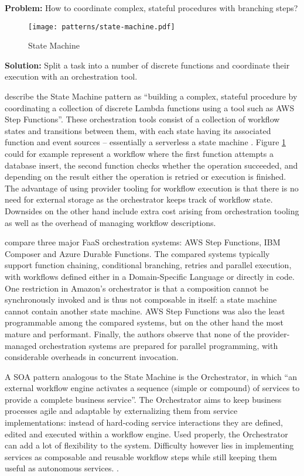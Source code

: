 \textbf{Problem:} How to coordinate complex, stateful procedures with branching steps?

\begin{figure}[h]
  \centering
  \texttt{[image: patterns/state-machine.pdf]}
  \caption{State Machine}
  \label{fig:patternStateMachine}
\end{figure}

\textbf{Solution:} Split a task into a number of discrete functions and coordinate their execution with an orchestration tool.

\textcite{hong18securingviaserverlesspatterns} describe the State Machine pattern as ``building a complex, stateful procedure by coordinating a collection of discrete Lambda functions using a tool such as AWS Step Functions''. These orchestration tools consist of a collection of workflow states and transitions between them, with each state having its associated function and event sources -- essentially a serverless a state machine \parencite{cncf18serverlessWG}. Figure \ref{fig:patternStateMachine} could for example represent a workflow where the first function attempts a database insert, the second function checks whether the operation succeeded, and depending on the result either the operation is retried or execution is finished. The advantage of using provider tooling for workflow execution is that there is no need for external storage as the orchestrator keeps track of workflow state. Downsides on the other hand include extra cost arising from orchestration tooling as well as the overhead of managing workflow descriptions.

\textcite{lopez18orchestration} compare three major FaaS orchestration systems: AWS Step Functions, IBM Composer and Azure Durable Functions. The compared systems typically support function chaining, conditional branching, retries and parallel execution, with workflows defined either in a Domain-Specific Language or directly in code. One restriction in Amazon's orchestrator is that a composition cannot be synchronously invoked and is thus not composable in itself: a state machine cannot contain another state machine. AWS Step Functions was also the least programmable among the compared systems, but on the other hand the most mature and performant. Finally, the authors observe that none of the provider-managed orchestration systems are prepared for parallel programming, with considerable overheads in concurrent invocation.

A SOA pattern analogous to the State Machine is the Orchestrator, in which ``an external workflow engine activates a sequence (simple or compound) of services to provide a complete business service''. The Orchestrator aims to keep business processes agile and adaptable by externalizing them from service implementations: instead of hard-coding service interactions they are defined, edited and executed within a workflow engine. Used properly, the Orchestrator can add a lot of flexibility to the system. Difficulty however lies in implementing services as composable and reusable workflow steps while still keeping them useful as autonomous services. \parencite{rotem12soa}.

